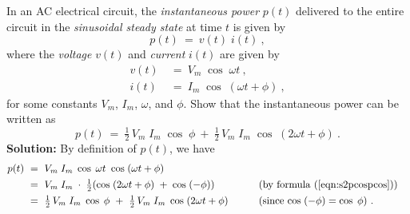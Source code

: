 \begin{exmp}\label{exmp:acpower}
 In an AC electrical circuit, the \emph{instantaneous power} $p(t)$ delivered to the entire circuit
 in the \emph{sinusoidal steady state} at time $t$ is given by
 \begin{displaymath}
  p(t) ~=~ v(t)\;i(t) ~,
 \end{displaymath}
 where the \emph{voltage} $v(t)$ and \emph{current} $i(t)$ are given by
 \begin{align*}
  v(t) ~&=~ V_m \;\cos\;\omega t ~,\\
  i(t) ~&=~ I_m \;\cos\;(\omega t + \phi)~,
 \end{align*}
 for some constants $V_m$, $I_m$, $\omega$, and $\phi$. Show that the instantaneous power can be
 written as
 \begin{displaymath}
  p(t) ~=~ \tfrac{1}{2}\,V_m \; I_m \;\cos\;\phi ~+~
   \tfrac{1}{2}\,V_m \; I_m \;\cos\;(2\omega t + \phi) ~.
 \end{displaymath}
 \noindent\textbf{Solution:} By definition of $p(t)$, we have
 \begin{alignat*}{2}
  p(t) ~&=~ V_m \;I_m \;\cos\;\omega t~\cos\;(\omega t + \phi)\\
  &=~ V_m \;I_m \;\cdot\;\tfrac{1}{2}(\cos\;(2\omega t + \phi) \;+\; \cos\;(-\phi))
  \qquad&&\text{(by formula (\ref{eqn:s2pcospcos}))}\\
  &=~ \tfrac{1}{2}\,V_m \; I_m \;\cos\;\phi ~+~
  \tfrac{1}{2}\,V_m \; I_m \;\cos\;(2\omega t + \phi)
  \qquad&&\text{(since $\cos\;(-\phi) = \cos\;\phi$)}~.
 \end{alignat*}
\end{exmp}
\divider
\newpage
\startexercises\label{sec3dot4}
\vspace{5mm}
